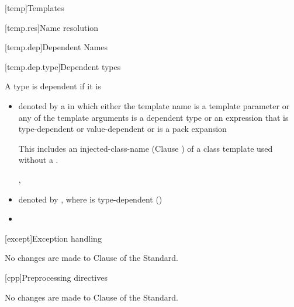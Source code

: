 
[temp]{Templates}

\setcounter{section}{6}
[temp.res]{Name resolution}

\setcounter{subsection}{1}
[temp.dep]{Dependent Names}

[temp.dep.type]{Dependent types}

\begin{std.txt}

A type is dependent if it is \newline
[...]

\begin{itemize}
  \item denoted by a  in which either the template name is a template parameter or any of
the template arguments is a dependent type or an expression that is type-dependent or value-dependent
or is a pack expansion \begin{note} This includes an injected-class-name (Clause
) of a class template used
without a . \end{note}, 


  \item denoted by \tcode{)}, where
         is type-dependent ()
  \item {}
\end{itemize}
\end{std.txt}

[except]{Exception handling}

No changes are made to Clause \the\value{chapter} of the \Cpp Standard.

[cpp]{Preprocessing directives}

No changes are made to Clause \the\value{chapter} of the \Cpp Standard.
